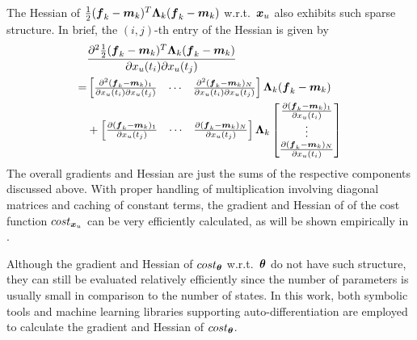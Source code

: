 The Hessian of $\frac{1}{2}(\boldsymbol{f}_{k}-\boldsymbol{m}_{k})^T\boldsymbol{\Lambda}_{k}(\boldsymbol{f}_{k}-\boldsymbol{m}_{k})$ w.r.t.\ $\boldsymbol{x}_{u}$ also exhibits such sparse structure.
In brief, the $(i, j)$-th entry of the Hessian is given by
\begin{align}
    &\frac{
        \partial^{2}\frac{1}{2}(\boldsymbol{f}_{k}-\boldsymbol{m}_{k})^T\boldsymbol{\Lambda}_{k}(\boldsymbol{f}_{k}-\boldsymbol{m}_{k})}{
        \partial x_{u}(t_{i})\partial x_{u}(t_{j})}
    \nonumber
    \\
    = & \begin{bmatrix}
        \frac{\partial^2(\boldsymbol{f}_{k}-\boldsymbol{m}_{k})_1}{\partial x_{u}(t_{i})\partial x_{u}(t_{j})}
        &
        \cdots
        &
        \frac{\partial^2(\boldsymbol{f}_{k}-\boldsymbol{m}_{k})_N}{\partial x_{u}(t_{i})\partial x_{u}(t_{j})}
    \end{bmatrix}
    \boldsymbol{\Lambda}_{k}(\boldsymbol{f}_{k}-\boldsymbol{m}_{k}) 
    \nonumber
    \\
    & + 
    \begin{bmatrix}
        \frac{\partial(\boldsymbol{f}_{k}-\boldsymbol{m}_{k})_1}{\partial x_{u}(t_{j})}
        &
        \cdots
        &
        \frac{\partial(\boldsymbol{f}_{k}-\boldsymbol{m}_{k})_N}{\partial x_{u}(t_{j})}
    \end{bmatrix}
    \boldsymbol{\Lambda}_{k}
    \begin{bmatrix}
        \frac{\partial(\boldsymbol{f}_{k}-\boldsymbol{m}_{k})_1}{\partial x_{u}(t_{i})}
        \\
        \vdots
        \\
        \frac{\partial(\boldsymbol{f}_{k}-\boldsymbol{m}_{k})_N}{\partial x_{u}(t_{i})}
    \end{bmatrix}
\end{align}
The overall gradients and Hessian are just the sums of the respective components discussed above.
With proper handling of multiplication involving diagonal matrices and caching of constant terms, the gradient and Hessian of of the cost function $cost_{\boldsymbol{x}_{u}}$ can be very efficiently calculated, as will be shown empirically in .

Although the gradient and Hessian of $cost_{\boldsymbol{\theta}}$  w.r.t.\ $\boldsymbol{\theta}$ do not have such structure, they can still be evaluated relatively efficiently since the number of parameters is usually small in comparison to the number of states.
In this work, both symbolic tools and machine learning libraries supporting auto-differentiation are employed to calculate the gradient and Hessian of $cost_{\boldsymbol{\theta}}$.

